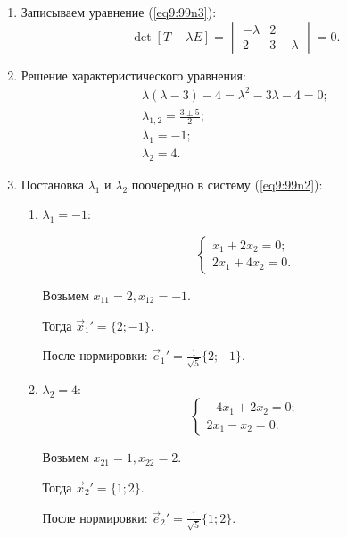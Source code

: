 	\begin{solution}
	
	\begin{enumerate}
	\item Записываем уравнение (\ref{eq9:99n3}):
		\[ \det[T - \lambda E] = \begin{vmatrix}
				-\lambda & 2 \\
				2 & 3 - \lambda
		\end{vmatrix} = 0. \]

	\item Решение характеристического уравнения:
		\[ \begin{array}{l}
			\lambda(\lambda - 3) - 4 = \lambda^2 - 3\lambda - 4 = 0;\\
			\lambda_{1, 2} = \frac{3 \pm 5}{2}; \\
			\lambda_1 = -1; \\
			\lambda_2 = 4.
		\end{array} \]

	\item Постановка \( \lambda_1 \) и \( \lambda_2 \) поочередно в систему (\ref{eq9:99n2}):
		\begin{enumerate}
		\item \( \lambda_1 = -1 \):
		
		\[ \left\{ \begin{array}{l}
			x_1 + 2x_2 = 0; \\
			2x_1 + 4x_2 = 0.
		\end{array} \right. \]
		
		Возьмем \( x_{11} = 2, x_{12} = -1 \).
			
		Тогда \( \vec{x}_1{'} = \{ 2; -1 \} \).
			
		После нормировки: \( \vec{e}_1{'} = \frac{1}{\sqrt{5}}\{ 2; -1 \} \).
			
		\item \( \lambda_2 = 4 \):
		\[ \left\{ \begin{array}{l}
				-4x_1 + 2x_2 = 0; \\
				2x_1 - x_2 = 0.
		\end{array} \right. \]
		
		Возьмем \( x_{21} = 1, x_{22} = 2 \).
			
		Тогда \( \vec{x}_2{'} = \{ 1; 2 \} \).
		
		После нормировки: \( \vec{e}_2{'} = \frac{1}{\sqrt{5}}\{ 1; 2 \} \).
		\end{enumerate}
	\end{enumerate}
	

\end{solution}

